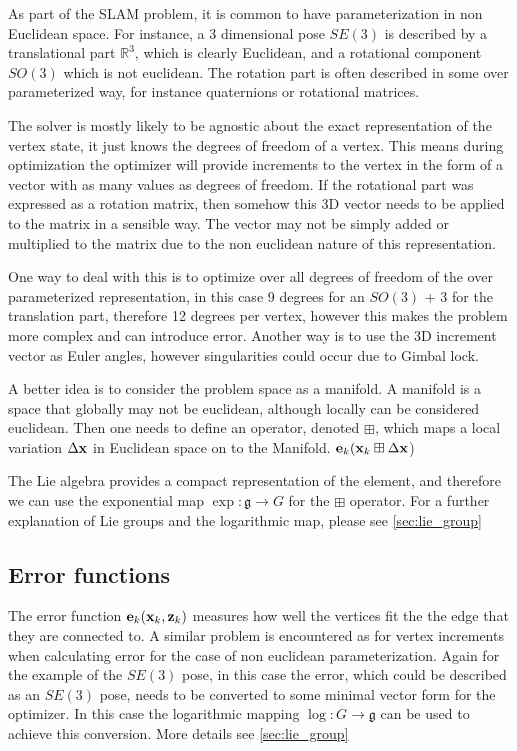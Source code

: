 As part of the SLAM problem, it is common to have parameterization in non Euclidean space.  For instance, a 3 dimensional pose $SE(3)$ is described by a translational part $\mathbb{R}^3$, which is clearly Euclidean, and a rotational component $SO(3)$ which is not euclidean.  The rotation part is often described in some over parameterized way, for instance quaternions or rotational matrices.  

The solver is mostly likely to be agnostic about the exact representation of the vertex state, it just knows the degrees of freedom of a vertex.  This means during optimization the optimizer will provide increments to the vertex in the form of a vector with as many values as degrees of freedom.  If the rotational part was expressed as a rotation matrix, then somehow this 3D vector needs to be applied to the matrix in a sensible way.  The vector may not be simply added or multiplied to the matrix due to the non euclidean nature of this representation.

One way to deal with this is to optimize over all degrees of freedom of the over parameterized representation, in this case 9 degrees for an $SO(3)$ + 3 for the translation part, therefore 12 degrees per vertex, however this makes the problem more complex and can introduce error.  Another way is to use the 3D increment vector as Euler angles, however singularities could occur due to Gimbal lock.

A better idea is to consider the problem space as a manifold.  A manifold is a space that globally may not be euclidean, although locally can be considered euclidean.  Then one needs to define an operator, denoted $\boxplus$, which maps a local variation $\Delta\mathbf x$ in Euclidean space on to the Manifold. $\mathbf e_k(\mathbf x_k \boxplus \Delta\mathbf x$)

The Lie algebra provides a compact representation of the element, and therefore we can use the exponential map $\exp\colon \mathfrak g \to G$ for the $\boxplus$ operator.  For a further explanation of Lie groups and the logarithmic map, please see \ref{sec:lie_group}

\subsection{Error functions}
\label{sec:error_function}
The error function $\mathbf e_k(\mathbf x_k, \mathbf z_k)$ measures how well the vertices fit the the edge that they are connected to.  A similar problem is encountered as for vertex increments when calculating error for the case of non euclidean parameterization.  Again for the example of the $SE(3)$ pose, in this case the error, which could be described as an $SE(3)$ pose, needs to be converted to some minimal vector form for the optimizer.  In this case the  logarithmic mapping $\log\colon G \to \mathfrak g$ can be used to achieve this conversion. More details see \ref{sec:lie_group}

